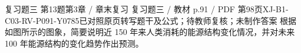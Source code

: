 \par\noindent\begin{minipage}{\linewidth}
\begin{bankitem}{复习题三 第13题}{第3章 / 章末复习 复习题三 / 教材 p.91 / PDF 第98页}{XJ-B1-C03-RV-P091-Y0785}{已对照原页转写题干及公式；待教师复核；未制作答案}
根据如图所示的图象，简要说明近 150 年来人类消耗的能源结构变化情况，并对未来 100 年能源结构的变化趋势作出预测。
\end{bankitem}
\end{minipage}\par\medskip

